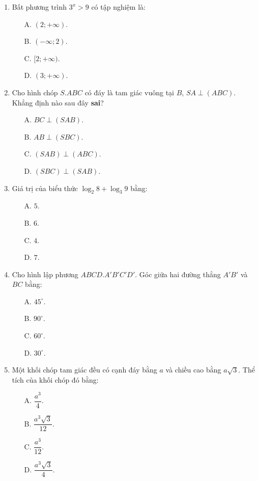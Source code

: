 \documentclass[12pt, a4paper]{article}
\begin{document}
\begin{enumerate}[leftmargin=0.8cm]
    \item Bất phương trình $3^x > 9$ có tập nghiệm là:
    \begin{enumerate}[leftmargin=0.6cm]
        \item[A.] $(2; +\infty)$.
        \item[B.] $(-\infty; 2)$.
        \item[C.] $[2; +\infty)$.
        \item[D.] $(3; +\infty)$.
    \end{enumerate}

    \item Cho hình chóp $S.ABC$ có đáy là tam giác vuông tại $B$, $SA \perp (ABC)$. Khẳng định nào sau đây \textbf{sai}?
    \begin{enumerate}[leftmargin=0.6cm]
        \item[A.] $BC \perp (SAB)$.
        \item[B.] $AB \perp (SBC)$.
        \item[C.] $(SAB) \perp (ABC)$.
        \item[D.] $(SBC) \perp (SAB)$.
    \end{enumerate}

    \item Giá trị của biểu thức $\log_2 8 + \log_3 9$ bằng:
    \begin{enumerate}[leftmargin=0.6cm]
        \item[A.] $5$.
        \item[B.] $6$.
        \item[C.] $4$.
        \item[D.] $7$.
    \end{enumerate}

    \item Cho hình lập phương $ABCD.A'B'C'D'$. Góc giữa hai đường thẳng $A'B'$ và $BC$ bằng:
    \begin{enumerate}[leftmargin=0.6cm]
        \item[A.] $45^\circ$.
        \item[B.] $90^\circ$.
        \item[C.] $60^\circ$.
        \item[D.] $30^\circ$.
    \end{enumerate}

    \item Một khối chóp tam giác đều có cạnh đáy bằng $a$ và chiều cao bằng $a\sqrt{3}$. Thể tích của khối chóp đó bằng:
    \begin{enumerate}[leftmargin=0.6cm]
        \item[A.] $\dfrac{a^3}{4}$.
        \item[B.] $\dfrac{a^3\sqrt{3}}{12}$.
        \item[C.] $\dfrac{a^3}{12}$.
        \item[D.] $\dfrac{a^3\sqrt{3}}{4}$.
    \end{enumerate}


\end{enumerate}
\end{document}
